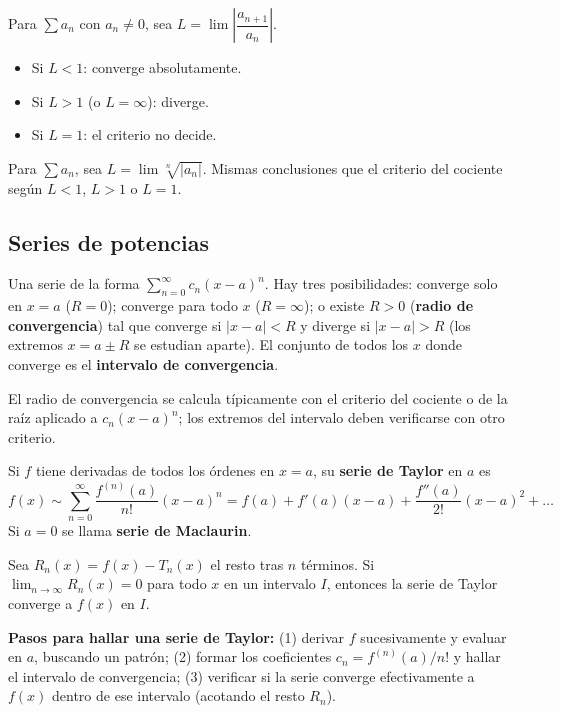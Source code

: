 \documentclass[11pt,a4paper]{article}
\begin{document}
\begin{teo}
Para $\sum a_n$ con $a_n\ne0$, sea $L=\lim\left|\dfrac{a_{n+1}}{a_n}\right|$.
\begin{itemize}
    \item Si $L<1$: converge absolutamente.
    \item Si $L>1$ (o $L=\infty$): diverge.
    \item Si $L=1$: el criterio no decide.
\end{itemize}
\end{teo}

\begin{teo}
Para $\sum a_n$, sea $L=\lim\sqrt[n]{|a_n|}$. Mismas conclusiones que el criterio del cociente según $L<1$, $L>1$ o $L=1$.
\end{teo}

\subsection{Series de potencias}

\begin{defi}
Una serie de la forma $\displaystyle\sum_{n=0}^\infty c_n(x-a)^n$. Hay tres posibilidades: converge solo en $x=a$ ($R=0$); converge para todo $x$ ($R=\infty$); o existe $R>0$ (\textbf{radio de convergencia}) tal que converge si $|x-a|<R$ y diverge si $|x-a|>R$ (los extremos $x=a\pm R$ se estudian aparte). El conjunto de todos los $x$ donde converge es el \textbf{intervalo de convergencia}.
\end{defi}

El radio de convergencia se calcula típicamente con el criterio del cociente o de la raíz aplicado a $c_n(x-a)^n$; los extremos del intervalo deben verificarse con otro criterio.

\begin{defi}
Si $f$ tiene derivadas de todos los órdenes en $x=a$, su \textbf{serie de Taylor} en $a$ es
\[
f(x)\sim\sum_{n=0}^\infty \frac{f^{(n)}(a)}{n!}(x-a)^n
=f(a)+f'(a)(x-a)+\frac{f''(a)}{2!}(x-a)^2+\dots
\]
Si $a=0$ se llama \textbf{serie de Maclaurin}.
\end{defi}

\begin{teo}
Sea $R_n(x)=f(x)-T_n(x)$ el resto tras $n$ términos. Si $\lim_{n\to\infty}R_n(x)=0$ para todo $x$ en un intervalo $I$, entonces la serie de Taylor converge a $f(x)$ en $I$.
\end{teo}

\textbf{Pasos para hallar una serie de Taylor:} (1) derivar $f$ sucesivamente y evaluar en $a$, buscando un patrón; (2) formar los coeficientes $c_n=f^{(n)}(a)/n!$ y hallar el intervalo de convergencia; (3) verificar si la serie converge efectivamente a $f(x)$ dentro de ese intervalo (acotando el resto $R_n$).
\end{document}
